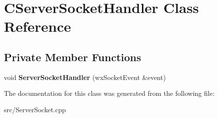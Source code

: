 \section{CServerSocketHandler Class Reference}
\label{classCServerSocketHandler}
\subsection*{Private Member Functions}
\begin{DoxyCompactItemize}
\item 
void {\bfseries ServerSocketHandler} (wxSocketEvent \&event)\label{classCServerSocketHandler_a520dd7d709a9b7a6895994c22fff0a5c}

\end{DoxyCompactItemize}


The documentation for this class was generated from the following file:\begin{DoxyCompactItemize}
\item 
src/ServerSocket.cpp\end{DoxyCompactItemize}
